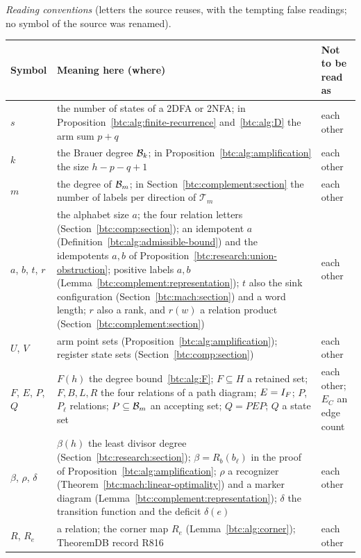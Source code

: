 \medskip\noindent\begin{minipage}{\textwidth}
\emph{Reading conventions} (letters the source reuses, with the tempting
false readings; no symbol of the source was renamed).\par
\smallskip
\begingroup\small\renewcommand{\arraystretch}{1.1}
\noindent\begin{tabular}{@{}>{\raggedright\arraybackslash}p{0.75in}>{\raggedright\arraybackslash}p{3.55in}>{\raggedright\arraybackslash}p{1.85in}@{}}
\toprule
Symbol & Meaning here (where) & Not to be read as\\
\midrule
$s$ & the number of states of a 2DFA or 2NFA; in Proposition~\ref{btc:alg:finite-recurrence} and~\eqref{btc:alg:D} the arm sum $p+q$ & each other\\
$k$ & the Brauer degree $\mathcal{B}_{k}$; in Proposition~\ref{btc:alg:amplification} the size $h-p-q+1$ & each other\\
$m$ & the degree of $\mathcal{B}_{m}$; in Section~\ref{btc:complement:section} the number of labels per direction of $\mathcal T_m$ & each other\\
$a$, $b$, $t$, $r$ & the alphabet size $a$; the four relation letters (Section~\ref{btc:comp:section}); an idempotent $a$ (Definition~\ref{btc:alg:admissible-bound}) and the idempotents $a,b$ of Proposition~\ref{btc:research:union-obstruction}; positive labels $a,b$ (Lemma~\ref{btc:complement:representation}); $t$ also the sink configuration (Section~\ref{btc:mach:section}) and a word length; $r$ also a rank, and $r(w)$ a relation product (Section~\ref{btc:complement:section}) & each other\\
$U$, $V$ & arm point sets (Proposition~\ref{btc:alg:amplification}); register state sets (Section~\ref{btc:comp:section}) & each other\\
$F$, $E$, $P$, $Q$ & $F(h)$ the degree bound~\eqref{btc:alg:F}; $F\subseteq H$ a retained set; $F,B,L,R$ the four relations of a path diagram; $E=I_F$; $P$, $P_\ell$ relations; $P\subseteq\mathcal{B}_{m}$ an accepting set; $Q=PEP$; $Q$ a state set & each other; $E_C$ an edge count\\
$\beta$, $\rho$, $\delta$ & $\beta(h)$ the least divisor degree (Section~\ref{btc:research:section}); $\beta=R_b(b_\ell)$ in the proof of Proposition~\ref{btc:alg:amplification}; $\rho$ a recognizer (Theorem~\ref{btc:mach:linear-optimality}) and a marker diagram (Lemma~\ref{btc:complement:representation}); $\delta$ the transition function and the deficit $\delta(e)$ & each other\\
$R$, $R_e$ & a relation; the corner map $R_e$ (Lemma~\ref{btc:alg:corner}); TheoremDB record R816 & each other\\

\end{tabular}
\end{minipage}
